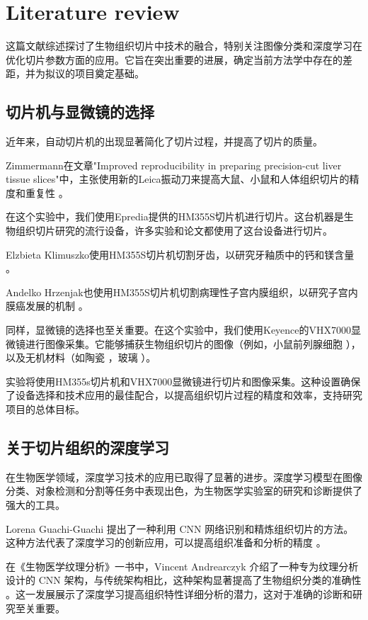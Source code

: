 \section{Literature review}


这篇文献综述探讨了生物组织切片中技术的融合，特别关注图像分类和深度学习在优化切片参数方面的应用。它旨在突出重要的进展，确定当前方法学中存在的差距，并为拟议的项目奠定基础。

\subsection{切片机与显微镜的选择}

近年来，自动切片机的出现显著简化了切片过程，并提高了切片的质量。

Zimmermann在文章"Improved reproducibility in preparing precision-cut liver tissue slices"中，主张使用新的Leica振动刀来提高大鼠、小鼠和人体组织切片的精度和重复性 \cite{LR.1}。

在这个实验中，我们使用Epredia提供的HM355S切片机进行切片。这台机器是生物组织切片研究的流行设备，许多实验和论文都使用了这台设备进行切片。

Elzbieta Klimuszko使用HM355S切片机切割牙齿，以研究牙釉质中的钙和镁含量 \cite{LR.2}。

Andelko Hrzenjak也使用HM355S切片机切割病理性子宫内膜组织，以研究子宫内膜癌发展的机制 \cite{LR.3}。

同样，显微镜的选择也至关重要。在这个实验中，我们使用Keyence的VHX7000显微镜进行图像采集。它能够捕获生物组织切片的图像（例如，小鼠前列腺细胞 \cite{LR.4}），以及无机材料（如陶瓷 \cite{LR.5}，玻璃 \cite{LR.6}）。

实验将使用HM355s切片机和VHX7000显微镜进行切片和图像采集。这种设置确保了设备选择和技术应用的最佳配合，以提高组织切片过程的精度和效率，支持研究项目的总体目标。

\subsection{关于切片组织的深度学习}

在生物医学领域，深度学习技术的应用已取得了显著的进步。深度学习模型在图像分类、对象检测和分割等任务中表现出色，为生物医学实验室的研究和诊断提供了强大的工具。

Lorena Guachi-Guachi 提出了一种利用 CNN 网络识别和精炼组织切片的方法。这种方法代表了深度学习的创新应用，可以提高组织准备和分析的精度 \cite{LR.7}。

在《生物医学纹理分析》一书中，Vincent Andrearczyk 介绍了一种专为纹理分析设计的 CNN 架构，与传统架构相比，这种架构显著提高了生物组织分类的准确性 \cite{LR.8}。这一发展展示了深度学习提高组织特性详细分析的潜力，这对于准确的诊断和研究至关重要。

